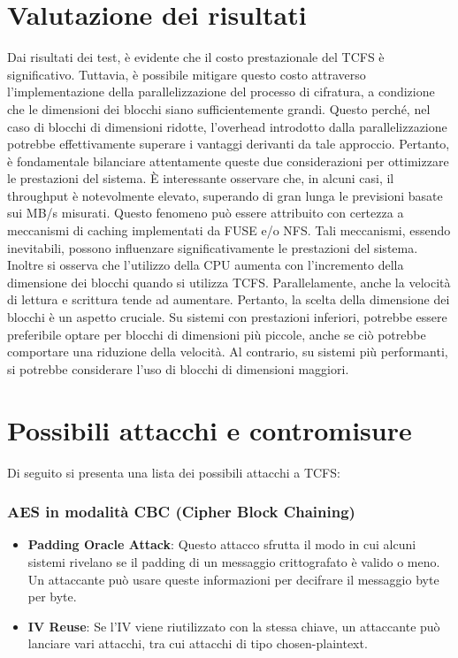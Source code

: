 \section{Valutazione dei risultati}
Dai risultati dei test, è evidente che il costo prestazionale del TCFS è significativo. Tuttavia, è possibile mitigare questo costo attraverso l’implementazione della parallelizzazione del processo di cifratura, a condizione che le dimensioni dei blocchi siano sufficientemente grandi. Questo perché, nel caso di blocchi di dimensioni ridotte, l’overhead introdotto dalla parallelizzazione potrebbe effettivamente superare i vantaggi derivanti da tale approccio. Pertanto, è fondamentale bilanciare attentamente queste due considerazioni per ottimizzare le prestazioni del sistema. È interessante osservare che, in alcuni casi, il throughput è notevolmente elevato, superando di gran lunga le previsioni basate sui MB/s misurati. Questo fenomeno può essere attribuito con certezza a meccanismi di caching implementati da FUSE e/o NFS. Tali meccanismi, essendo inevitabili, possono influenzare significativamente le prestazioni del sistema. Inoltre si osserva che l’utilizzo della CPU aumenta con l’incremento della dimensione dei blocchi quando si utilizza TCFS. Parallelamente, anche la velocità di lettura e scrittura tende ad aumentare. Pertanto, la scelta della dimensione dei blocchi è un aspetto cruciale. Su sistemi con prestazioni inferiori, potrebbe essere preferibile optare per blocchi di dimensioni più piccole, anche se ciò potrebbe comportare una riduzione della velocità. Al contrario, su sistemi più performanti, si potrebbe considerare l’uso di blocchi di dimensioni maggiori.

\section{Possibili attacchi e contromisure}
Di seguito si presenta una lista dei possibili attacchi a TCFS:
\subsubsection{AES in modalità CBC (Cipher Block Chaining)}
\begin{itemize}
    \item \textbf{Padding Oracle Attack}: Questo attacco sfrutta il modo in cui alcuni sistemi rivelano se il padding di un messaggio crittografato è valido o meno\cite{AES-BasedTextEncryptionForNFC}. Un attaccante può usare queste informazioni per decifrare il messaggio byte per byte.\cite{cluster-basedPracticalKeyRecovery-differentialCryptanalysis}
    \item \textbf{IV Reuse}: Se l’IV viene riutilizzato con la stessa chiave, un attaccante può lanciare vari attacchi, tra cui attacchi di tipo chosen-plaintext. \cite{AES-CBC-ChosenPlaintextAttach}
\end{itemize}
